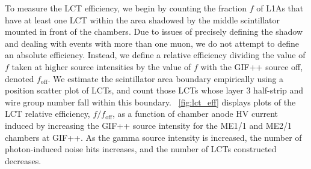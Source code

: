To measure the LCT efficiency, we begin by counting the fraction $f$ of L1As that have at least one LCT within the area shadowed by the middle scintillator mounted in front of the chambers. Due to issues of precisely defining the shadow and dealing with events with more than one muon, we do not attempt to define an absolute efficiency. Instead, we define a relative efficiency dividing the value of $f$ taken at higher source intensities by the value of $f$ with the GIF++ source off, denoted $f_\text{off}$. We estimate the scintillator area boundary empirically using a position scatter plot of LCTs, and count those LCTs whose layer 3 half-strip and wire group number fall within this boundary. \Fig~\ref{fig:lct_eff} displays plots of the LCT relative efficiency, $f/f_\text{off}$, as a function of chamber anode HV current induced by increasing the GIF++ source intensity for the ME1/1 and ME2/1 chambers at GIF++. As the gamma source intensity is increased, the number of photon-induced noise hits increases, and the number of LCTs constructed decreases.



